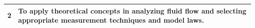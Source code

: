 \documentclass[12pt, a4paper]{article}
\begin{document}
\begin{center}
\begin{tabularx}{\textwidth}{|c|X|}
                                                                                                                                                                                                                                                                                                                                                                                                                                                                                                                                                                                                        2 & To apply theoretical concepts in analyzing fluid flow and selecting appropriate measurement techniques and model laws. \\
                                                                                                                                                                                                                                                                                                                                                                                                                                                                                                                                                                                                                \hline
                                                                                                                                                                                                                                                                                                                                                                                                                                                                                                                                                                                                                    \end{tabularx}
                                                                                                                                                                                                                                                                                                                                                                                                                                                                                                                                                                                                                    \end{center}
\end{document}

